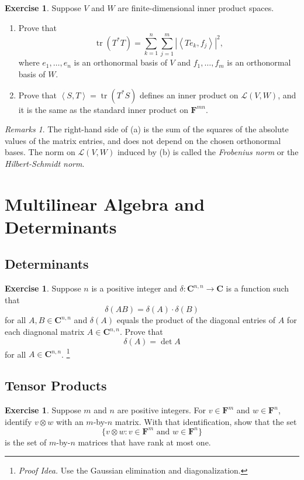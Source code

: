 \documentclass[nofonts,colorlinks]{tufte-handout}
\theoremstyle{plain} %
\theoremstyle{definition}
\newtheorem{exer}[thm]{Exercise}
\theoremstyle{remark}
\newtheorem{rmks}[thm]{Remarks}
\def\idea{\textit{\color[rgb]{0,0,.55}Proof Idea. }}
\newcommand{\inp}[2]{\mathopen{}\left\langle#1,#2\right\rangle}
\newcommand{\abs}[1]{\mathopen{}\left|#1\right|}
\newcommand{\C}{\mathbf{C}}
\newcommand{\F}{\mathbf{F}}
\renewcommand{\L}{\mathcal{L}}
\DeclareMathOperator{\tr}{tr}
\begin{document}
\begin{exer}
	Suppose $V$ and $W$ are finite-dimensional inner product spaces.
	\begin{enumerate}
		\item Prove that
		\[\tr(T^*T)=\sum_{k=1}^{n}\sum_{j=1}^{m}\abs{\inp{Te_k}{f_j}}^2,\]
		where $e_1,\dots,e_n$ is an orthonormal basis of $V$ and $f_1,\dots,f_m$ is an orthonormal basis of $W$.
		\item Prove that $\inp{S}{T}=\tr(T^*S)$ defines an inner product on $\L(V,W)$, and it is the same as the standard inner product on $\F^{mn}$.
	\end{enumerate}
\end{exer}
\begin{rmks}
	The right-hand side of (a) is the sum of the squares of the absolute values of the matrix entries, and does not depend on the chosen orthonormal bases. The norm on $\L(V,W)$ induced by (b) is called the \emph{Frobenius norm} or the \emph{Hilbert-Schmidt norm}.
\end{rmks}


\section{Multilinear Algebra and Determinants}
\subsection{Determinants}
\begin{exer}
	Suppose $n$ is a positive integer and $\delta:\C^{n,n}\to\C$ is a function such that
	\[\delta(AB)=\delta(A)\cdot\delta(B)\]
	for all $A,B\in\C^{n,n}$ and $\delta(A)$ equals the product of the diagonal entries of $A$ for each diagnonal matrix $A\in\C^{n,n}$. Prove that
	\[\delta(A)=\det A\]
	for all $A\in\C^{n,n}$.%
	\footnote{\idea Use the Gaussian elimination and diagonalization.}
\end{exer}


\subsection{Tensor Products}
\begin{exer}
	Suppose $m$ and $n$ are positive integers. For $v\in\F^m$ and $w\in\F^n$, identify $v\otimes w$ with an $m$-by-$n$ matrix. With that identification, show that the set
	\[\{v\otimes w:v\in\F^m\text{ and }w\in\F^n\}\]
	is the set of $m$-by-$n$ matrices that have rank at most one.
\end{exer}
\end{document}
